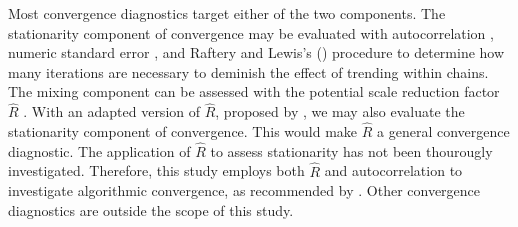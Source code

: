 \documentclass[article]{jss}
\begin{document}

Most convergence diagnostics target either of the two components. The stationarity component of convergence may be evaluated with autocorrelation \citep[$AC$][]{scha97, gelm13}, numeric standard error \citep[or `MC error'][]{gewe92}, and Raftery and Lewis's (\citeyear{raft91}) procedure to determine how many iterations are necessary to deminish the effect of trending within chains. The mixing component can be assessed with the potential scale reduction factor $\widehat{R}$ \citep[widely referred to as `the Gelman-Rubin statistic']{gelm92}. With an adapted version of $\widehat{R}$, proposed by \cite{veht19}, we may also evaluate the stationarity component of convergence. This would make $\widehat{R}$ a general convergence diagnostic. The application of $\widehat{R}$ to assess stationarity has not been thourougly investigated. Therefore, this study employs both $\widehat{R}$ and autocorrelation to investigate algorithmic convergence, as recommended by \cite[p.~898]{cowl96}.
Other convergence diagnostics are outside the scope of this study.\footnotemark 
{}%
\end{document}

